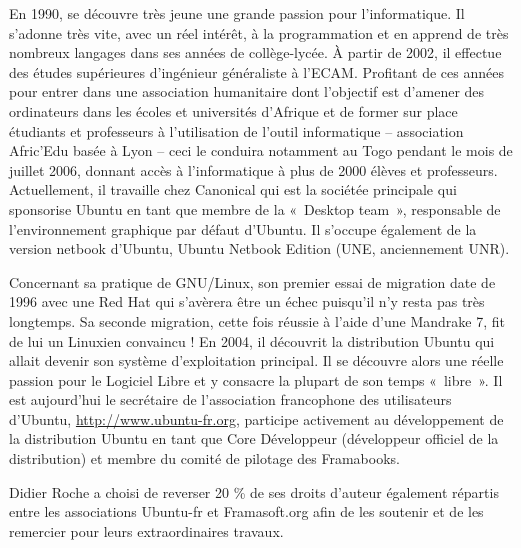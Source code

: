 En 1990,  se découvre très jeune une grande passion pour l'informatique. Il s'adonne très vite, avec un réel intérêt, à la programmation et en apprend de très nombreux langages dans ses années de collège-lycée. À partir de 2002, il effectue des études supérieures d'ingénieur généraliste à l'ECAM. Profitant de ces années pour entrer dans une association humanitaire dont l'objectif est d'amener des ordinateurs dans les écoles et universités d'Afrique et de former sur place étudiants et professeurs à l'utilisation de l'outil informatique -- association Afric'Edu basée à Lyon -- ceci le conduira notamment au Togo pendant le mois de juillet 2006, donnant accès à l'informatique à plus de 2000 élèves et professeurs. Actuellement, il travaille chez Canonical qui est la sociétée principale qui sponsorise Ubuntu en tant que membre de la «~Desktop team~», responsable de l'environnement graphique par défaut d'Ubuntu. Il s'occupe également de la version netbook d'Ubuntu, Ubuntu Netbook Edition (UNE, anciennement UNR).\par
Concernant sa pratique de GNU/Linux, son premier essai de migration date de 1996 avec une Red Hat qui s'avèrera être un échec puisqu'il n'y resta pas très longtemps. Sa seconde migration, cette fois réussie à l'aide d'une Mandrake 7, fit de lui un Linuxien convaincu ! En 2004, il découvrit la distribution Ubuntu qui allait devenir son système d'exploitation principal. Il se découvre alors une réelle passion pour le Logiciel Libre et y consacre la plupart de son temps «~libre~». Il est aujourd'hui le secrétaire de l'association francophone des utilisateurs d'Ubuntu, \url{http://www.ubuntu-fr.org}, participe activement au développement de la distribution Ubuntu en tant que Core Développeur (développeur officiel de la distribution) et membre du comité de pilotage des Framabooks.\par
Didier Roche a choisi de reverser 20 \% de ses droits d'auteur également répartis entre les associations Ubuntu-fr et Framasoft.org afin de les soutenir et de les remercier pour leurs extraordinaires travaux.\par
